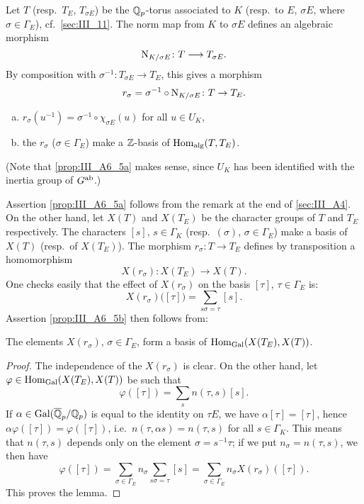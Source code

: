 \begin{subappendices}
Let $T$ (resp.\ $T_E$, $T_{\sigma E}$) be the $\mathbb{Q}_p$-torus associated to $K$
(resp.\ to $E$, $\sigma E$, where $\sigma \in \Gamma_E$), cf.\
\ref{sec:III_11}. The norm map from $K$ to $\sigma E$ defines an algebraic
morphism
\[
	\operatorname{N}_{K/\sigma E} \colon T \longrightarrow T_{\sigma E}.
\]
By composition with $\sigma^{-1} \colon T_{\sigma E} \to T_E$,
\dpage
this gives a morphism
\[
	r_\sigma = \sigma^{-1} \circ \operatorname{N}_{K/\sigma E} \colon T \to T_E.
\]
\begin{prop}\label{prop:III_A6_5}
\begin{enumerate}[(a)]
	\item\label{prop:III_A6_5a}
		$r_\sigma(u^{-1}) = \sigma^{-1}\circ\chi_{\sigma E}(u)$ for all
		$u \in U_K$,
	\item\label{prop:III_A6_5b}
		the $r_\sigma$ ($\sigma \in \Gamma_E$) make a $\mathbb{Z}$-basis of
		$\operatorname{Hom}_{\rm alg}(T, T_E)$.
\end{enumerate}
\end{prop}
(Note that \ref{prop:III_A6_5a} makes sense, since $U_K$ has been identified with
the inertia group of $G^{\mathrm{ab}}$.)

Assertion \ref{prop:III_A6_5a} follows from the remark at the end of
\ref{sec:III_A4}. On the other hand, let $X(T)$ and $X(T_E)$ be the character
groups of $T$ and $T_E$ respectively. The characters $[s]$, $s \in \Gamma_K$
(resp.\ $(\sigma)$, $\sigma \in \Gamma_E$) make a basis of $X(T)$ (resp.\ of
$X(T_E)$). The morphism $r_\sigma \colon T \to T_E$ defines by transposition a homomorphism
\[
	X(r_\sigma)\colon X(T_E) \longrightarrow X(T).
\]
One checks easily that the effect of $X(r_\sigma)$ on the basis $[\tau]$, $\tau \in \Gamma_E$ is:
\[
	X(r_\sigma)\big( [\tau] \big) = \sum_{s \sigma = \tau} [s].
\]
Assertion \ref{prop:III_A6_5b} then follows from:

\begin{lem}
	The elements $X(r_\sigma)$, $\sigma \in \Gamma_E$,
	\dpage
	form a basis of $\Hom_{\Gal}(X(T_E),\break X(T))$.
\end{lem}
\begin{proof}
	The independence of the $X(r_\sigma)$ is clear. On the other hand,
	let $\varphi \in \operatorname{Hom}_{\operatorname{Gal}}(X(T_E),X(T))$ be such that
	\[
		\varphi([\tau]) = \sum_{s} n(\tau, s)[s].
	\]
	If $\alpha \in \operatorname{Gal}(\overline{\mathbb{Q}}_p/\mathbb{Q}_p)$ is equal to the identity on $\tau
	E$, we have $\alpha[\tau] = [\tau]$, hence $\alpha \varphi([\tau]) =
	\varphi([\tau])$, i.e.\ $n(\tau, \alpha s) = n(\tau, s)$ for all $s \in
	\Gamma_K$. This means that $n(\tau, s)$ depends only on the element
	$\sigma = s^{-1} \tau$; if we put $n_\sigma = n(\tau, s)$, we then have
	\[
		\varphi([\tau]) = \sum_{\sigma \in \Gamma_E} n_\sigma
		\sum_{s\sigma = \tau} [s]
		= \sum_{\sigma \in \Gamma_E} n_\sigma X(r_\sigma)([\tau]).
	\]
	This proves the lemma.
\end{proof}


\end{subappendices}
